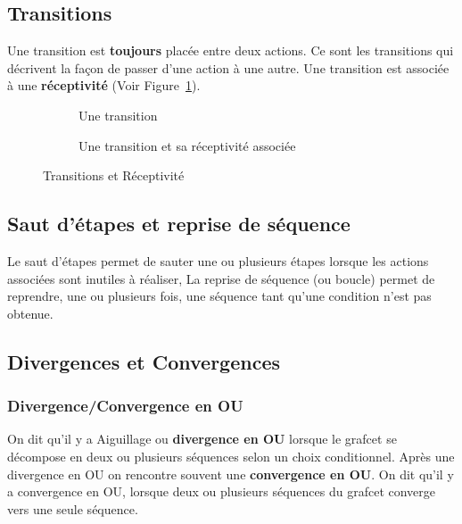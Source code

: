 \subsection{Transitions}

Une transition est \textbf{toujours} placée entre deux actions. Ce sont les transitions qui décrivent la façon de passer d'une action à une autre.
Une transition est associée à une \textbf{réceptivité} (Voir Figure~\ref{fig:transition}).


\begin{figure}[ht]
  \centering
  \begin{subfigure}[b]{.48\textwidth}
    \centering
    \caption{Une transition}
    \label{fig:transition}
  \end{subfigure}
  \begin{subfigure}[b]{.48\textwidth}
    \centering
    \caption{Une transition et sa réceptivité associée}
    \label{fig:transitionEtRecept}
  \end{subfigure}
  \caption{Transitions et Réceptivité}
\end{figure}

\subsection{Saut d'étapes et reprise de séquence}
Le saut d'étapes permet de sauter une ou plusieurs étapes lorsque les actions associées sont inutiles à réaliser, La reprise de séquence (ou boucle) permet de reprendre, une ou plusieurs fois, une séquence tant qu'une condition n'est pas obtenue.


\subsection{Divergences et Convergences}
\subsubsection{Divergence/Convergence en OU}
On dit qu'il y a Aiguillage ou \textbf{divergence en OU} lorsque le grafcet se décompose en deux ou plusieurs séquences selon un choix conditionnel. Après une divergence en OU on rencontre souvent une \textbf{convergence en OU}. On dit qu'il y a convergence en OU, lorsque deux ou plusieurs séquences du grafcet converge vers une seule séquence.

